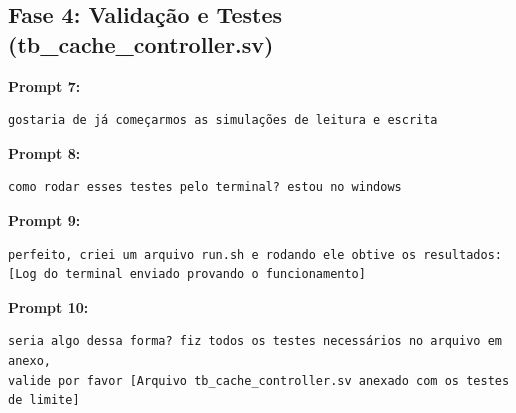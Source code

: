 ﻿\documentclass[12pt,a4paper]{article}
\begin{document}
\subsection{Fase 4: Validação e Testes (tb\_cache\_controller.sv)}
\textbf{Prompt 7:}
\begin{verbatim}
gostaria de já começarmos as simulações de leitura e escrita
\end{verbatim}

\textbf{Prompt 8:}
\begin{verbatim}
como rodar esses testes pelo terminal? estou no windows
\end{verbatim}

\textbf{Prompt 9:}
\begin{verbatim}
perfeito, criei um arquivo run.sh e rodando ele obtive os resultados:
[Log do terminal enviado provando o funcionamento]
\end{verbatim}

\textbf{Prompt 10:}
\begin{verbatim}
seria algo dessa forma? fiz todos os testes necessários no arquivo em anexo, 
valide por favor [Arquivo tb_cache_controller.sv anexado com os testes de limite]
\end{verbatim}
\end{document}
